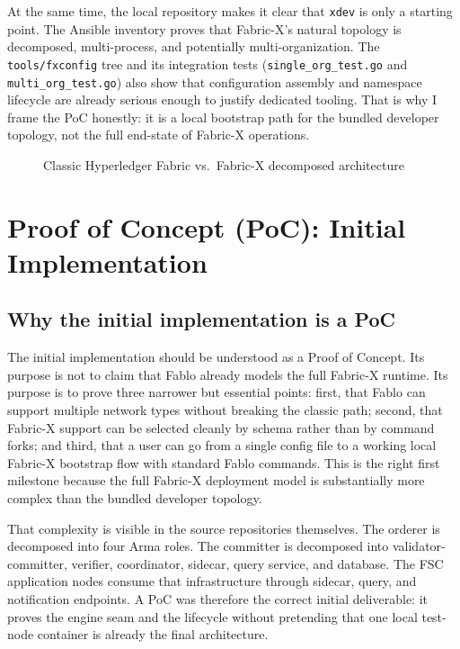 At the same time, the local repository makes it clear that \texttt{xdev} is only a starting point. The Ansible inventory proves that Fabric-X's natural topology is decomposed, multi-process, and potentially multi-organization. The \texttt{tools/fxconfig} tree and its integration tests (\texttt{single\_org\_test.go} and \texttt{multi\_org\_test.go}) also show that configuration assembly and namespace lifecycle are already serious enough to justify dedicated tooling. That is why I frame the PoC honestly: it is a local bootstrap path for the bundled developer topology, not the full end-state of Fabric-X operations.

\begin{figure}[h]
\centering
{}
\caption{Classic Hyperledger Fabric vs.\ Fabric-X decomposed architecture}
\label{fig:arch-comparison}
\end{figure}

\section{Proof of Concept (PoC): Initial Implementation}

\subsection{Why the initial implementation is a PoC}

The initial implementation should be understood as a Proof of Concept. Its purpose is not to claim that Fablo already models the full Fabric-X runtime. Its purpose is to prove three narrower but essential points: first, that Fablo can support multiple network types without breaking the classic path; second, that Fabric-X support can be selected cleanly by schema rather than by command forks; and third, that a user can go from a single config file to a working local Fabric-X bootstrap flow with standard Fablo commands. This is the right first milestone because the full Fabric-X deployment model is substantially more complex than the bundled developer topology.

That complexity is visible in the source repositories themselves. The orderer is decomposed into four Arma roles. The committer is decomposed into validator-committer, verifier, coordinator, sidecar, query service, and database. The FSC application nodes consume that infrastructure through sidecar, query, and notification endpoints. A PoC was therefore the correct initial deliverable: it proves the engine seam and the lifecycle without pretending that one local test-node container is already the final architecture.

